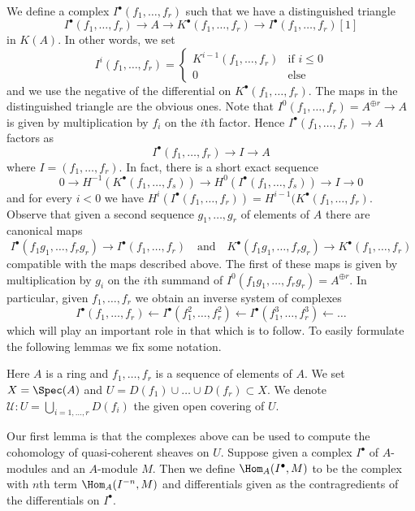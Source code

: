 \medskip\noindent
We define a complex $I^\bullet(f_1, \ldots, f_r)$
such that we have a distinguished triangle
$$
I^\bullet(f_1, \ldots, f_r) \to
A \to
K^\bullet(f_1, \ldots, f_r) \to
I^\bullet(f_1, \ldots, f_r)[1]
$$
in $K(A)$.
In other words, we set
$$
I^i(f_1, \ldots, f_r) =
\left\{
\begin{matrix}
K^{i - 1}(f_1, \ldots, f_r) & \text{if } i \leq 0 \\
0 & \text{else}
\end{matrix}
\right.
$$
and we use the negative of the differential on $K^\bullet(f_1, \ldots, f_r)$.
The maps in the distinguished triangle are the obvious ones. Note that
$I^0(f_1, \ldots, f_r) = A^{\oplus r} \to A$ is given by
multiplication by $f_i$ on the $i$th factor.
Hence $I^\bullet(f_1, \ldots, f_r) \to A$ factors as
$$
I^\bullet(f_1, \ldots, f_r) \to I \to A
$$
where $I = (f_1, \ldots, f_r)$. In fact, there is a short exact sequence
$$
0 \to H^{-1}(K^\bullet(f_1, \ldots, f_s)) \to
H^0(I^\bullet(f_1, \ldots, f_s)) \to I \to 0
$$
and for every $i < 0$ we have
$H^i(I^\bullet(f_1, \ldots, f_r)) = H^{i - 1}(K^\bullet(f_1, \ldots, f_r)$.
Observe that given a second sequence $g_1, \ldots, g_r$ of elements of $A$
there are canonical maps
$$
I^\bullet(f_1g_1, \ldots, f_rg_r) \to I^\bullet(f_1, \ldots, f_r)
\quad\text{and}\quad
K^\bullet(f_1g_1, \ldots, f_rg_r) \to K^\bullet(f_1, \ldots, f_r)
$$
compatible with the maps described above. The first of these maps is
given by multiplication by $g_i$ on the $i$th summand of
$I^0(f_1g_1, \ldots, f_rg_r) = A^{\oplus r}$. In particular, given
$f_1, \ldots, f_r$ we obtain an inverse system of complexes
\begin{equation}
\label{equation-system}
I^\bullet(f_1, \ldots, f_r) \leftarrow
I^\bullet(f_1^2, \ldots, f_r^2) \leftarrow
I^\bullet(f_1^3, \ldots, f_r^3) \leftarrow \ldots
\end{equation}
which will play an important role in that which is to follow.
To easily formulate the following lemmas we fix some notation.

\begin{situation}
\label{situation-complex}
Here $A$ is a ring and $f_1, \ldots, f_r$ is a sequence of elements of $A$.
We set $X = \Spec(A)$ and $U = D(f_1) \cup \ldots \cup D(f_r) \subset X$.
We denote $\mathcal{U} : U = \bigcup_{i = 1, \ldots, r} D(f_i)$ the
given open covering of $U$.
\end{situation}

\noindent
Our first lemma is that the complexes above can be used to compute
the cohomology of quasi-coherent sheaves on $U$. Suppose given a
complex $I^\bullet$ of $A$-modules and an $A$-module $M$. Then we
define $\Hom_A(I^\bullet, M)$ to be the complex with $n$th
term $\Hom_A(I^{-n}, M)$ and differentials given as the contragredients
of the differentials on $I^\bullet$.

